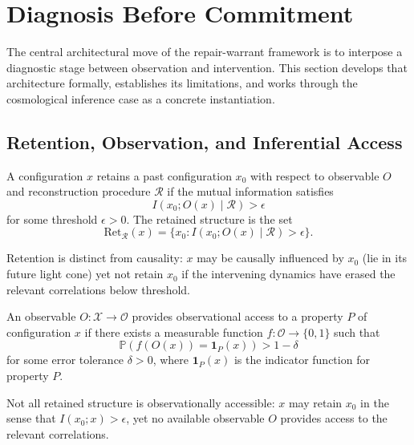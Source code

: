 
\section{Diagnosis Before Commitment}

The central architectural move of the repair-warrant framework is to interpose a diagnostic stage between observation and intervention. This section develops that architecture formally, establishes its limitations, and works through the cosmological inference case as a concrete instantiation.

\subsection{Retention, Observation, and Inferential Access}

\begin{definition}
A configuration $x$ retains a past configuration $x_0$ with respect to observable $O$ and reconstruction procedure $\mathcal{R}$ if the mutual information satisfies
\[
I(x_0; O(x) \mid \mathcal{R}) > \epsilon
\]
for some threshold $\epsilon > 0$. The retained structure is the set
\[
\mathrm{Ret}_{\mathcal{R}}(x) = \{x_0 : I(x_0; O(x) \mid \mathcal{R}) > \epsilon\}.
\]
\end{definition}

Retention is distinct from causality: $x$ may be causally influenced by $x_0$ (lie in its future light cone) yet not retain $x_0$ if the intervening dynamics have erased the relevant correlations below threshold.

\begin{definition}
An observable $O: \mathcal{X} \to \mathcal{O}$ provides observational access to a property $P$ of configuration $x$ if there exists a measurable function $f: \mathcal{O} \to \{0,1\}$ such that
\[
\mathbb{P}(f(O(x)) = \mathbf{1}_P(x)) > 1 - \delta
\]
for some error tolerance $\delta > 0$, where $\mathbf{1}_P(x)$ is the indicator function for property $P$.
\end{definition}

Not all retained structure is observationally accessible: $x$ may retain $x_0$ in the sense that $I(x_0; x) > \epsilon$, yet no available observable $O$ provides access to the relevant correlations.

